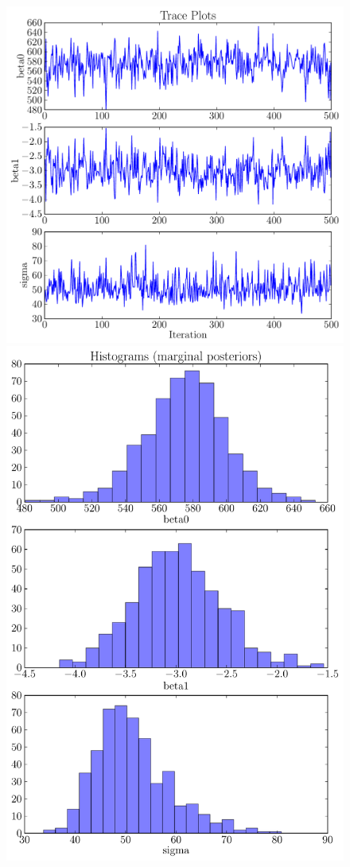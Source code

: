 \begin{figure}[!ht]
\begin{center}
\includegraphics[scale=0.35]{Figures/road_trace.pdf}
\includegraphics[scale=0.35]{Figures/road_hist.pdf}

\end{center}
\end{figure}
